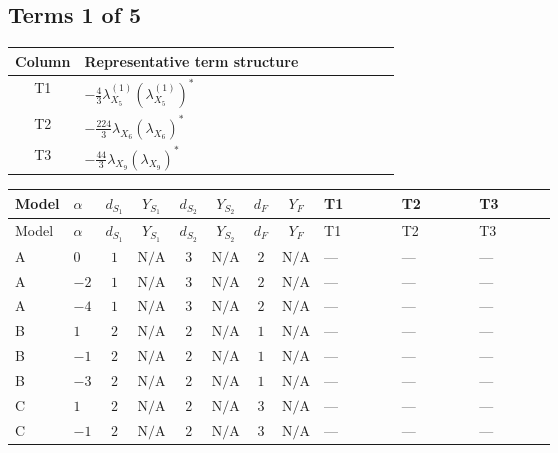\documentclass[8pt]{article}
\begin{document}
\begin{landscape}
\subsection*{Terms 1 of 5}
\begin{center}
\begin{tabular}{@{}c >{\raggedright\arraybackslash}p{0.82\linewidth}@{}}
\toprule
Column & Representative term structure \\
\midrule
T1 & \(\displaystyle -\frac{4}{3} {\lambda_{X_{5}}^{(1)}} \left({\lambda_{X_{5}}^{(1)}}\right)^{*}\) \\
\midrule
T2 & \(\displaystyle -\frac{224}{3} {\lambda_{X_{6}}} \left({\lambda_{X_{6}}}\right)^{*}\) \\
\midrule
T3 & \(\displaystyle -\frac{44}{3} {\lambda_{X_{9}}} \left({\lambda_{X_{9}}}\right)^{*}\) \\
\midrule
\bottomrule
\end{tabular}
\end{center}
\smallskip
\tiny
\begin{longtable}{@{}llcccccc >{\raggedright\arraybackslash}p{0.21\linewidth} >{\raggedright\arraybackslash}p{0.21\linewidth} >{\raggedright\arraybackslash}p{0.21\linewidth}@{}}
\toprule
Model & $\alpha$ & $d_{S_1}$ & $Y_{S_1}$ & $d_{S_2}$ & $Y_{S_2}$ & $d_F$ & $Y_F$ & T1 & T2 & T3 \\
\midrule
\endfirsthead
\toprule
Model & $\alpha$ & $d_{S_1}$ & $Y_{S_1}$ & $d_{S_2}$ & $Y_{S_2}$ & $d_F$ & $Y_F$ & T1 & T2 & T3 \\
\midrule
\endhead
A & $0$ & $1$ & $\text{N/A}$ & $3$ & $\text{N/A}$ & $2$ & $\text{N/A}$ & --- & --- & --- \\
\midrule
A & $-2$ & $1$ & $\text{N/A}$ & $3$ & $\text{N/A}$ & $2$ & $\text{N/A}$ & --- & --- & --- \\
\midrule
A & $-4$ & $1$ & $\text{N/A}$ & $3$ & $\text{N/A}$ & $2$ & $\text{N/A}$ & --- & --- & --- \\
\midrule
B & $1$ & $2$ & $\text{N/A}$ & $2$ & $\text{N/A}$ & $1$ & $\text{N/A}$ & --- & --- & --- \\
\midrule
B & $-1$ & $2$ & $\text{N/A}$ & $2$ & $\text{N/A}$ & $1$ & $\text{N/A}$ & --- & --- & --- \\
\midrule
B & $-3$ & $2$ & $\text{N/A}$ & $2$ & $\text{N/A}$ & $1$ & $\text{N/A}$ & --- & --- & --- \\
\midrule
C & $1$ & $2$ & $\text{N/A}$ & $2$ & $\text{N/A}$ & $3$ & $\text{N/A}$ & --- & --- & --- \\
\midrule
C & $-1$ & $2$ & $\text{N/A}$ & $2$ & $\text{N/A}$ & $3$ & $\text{N/A}$ & --- & --- & --- \\

\end{longtable}
\end{landscape}
\end{document}
